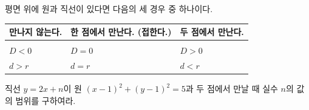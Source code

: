 \documentclass{oblivoir}
\begin{document}
\newpage
%
\label{circleline2}
평면 위에 원과 직선이 있다면 다음의 세 경우 중 하나이다.
\par\bigskip\noindent
\begin{tabu}{X[c]|X[c]|X[c]}
\toprule
만나지 않는다.	&한 점에서 만난다. (접한다.)	&두 점에서 만난다.\\
\hline
&
&
\\\hline
\(D<0\)		&\(D=0\)	&\(D>0\)
\\\hline
\(d>r\)		&\(d=r\)	&\(d<r\)
\\\bottomrule
\end{tabu}
\par\bigskip

%
\prob{}\label{circleline3}
직선 \(y=2x+n\)이 원 \((x-1)^2+(y-1)^2=5\)과 두 점에서 만날 때 실수 \(n\)의 값의 범위를 구하여라.
\begin{mdframed}[frametitle=풀이1]
\vspace{.15\textheight}
\end{mdframed}
\begin{mdframed}[frametitle=풀이2]
\vspace{.15\textheight}
\end{mdframed}

\end{document}
